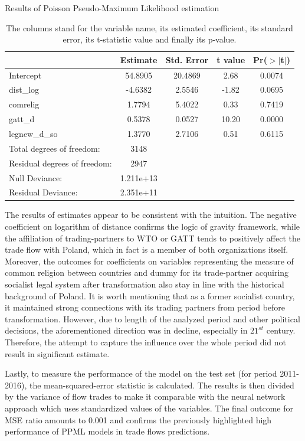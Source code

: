 \documentclass{Trade_template}
\numberwithin{equation}{section}
\begin{document}
\begin{table}[H]
\centering
\caption{Results of Poisson Pseudo-Maximum Likelihood estimation}
\begin{tabular}{lcccc}
  \hline
 & Estimate & Std. Error & t value & Pr($>$$|$t$|$) \\ 
  \hline
Intercept & 54.8905 & 20.4869 & 2.68 & 0.0074 \\ 
  dist\_log & -4.6382 & 2.5546 & -1.82 & 0.0695 \\ 
  comrelig & 1.7794 & 5.4022 & 0.33 & 0.7419 \\ 
  gatt\_d & 0.5378 & 0.0527 & 10.20 & 0.0000 \\  
  legnew\_d\_so & 1.3770 & 2.7106 & 0.51 & 0.6115 \\ 
   \hline
Total degrees of freedom: & 3148 &&& \\
Residual degrees of freedom: & 2947 &&& \\
Null Deviance:	  &  1.211e+13 & & & \\
Residual Deviance: & 2.351e+11 & & & 	\\
\hline
\end{tabular}
\caption*{\small{The columns stand for the variable name, its estimated coefficient, its standard error, its t-statistic value and finally its p-value.}}
\end{table}

The results of estimates appear to be consistent with the intuition. The negative coefficient on logarithm of distance confirms the logic of gravity framework, while the affiliation of trading-partners to WTO or GATT tends to positively affect the trade flow with Poland, which in fact is a member of both organizations itself.
Moreover, the outcomes for coefficients on variables representing the measure of common religion between countries and dummy for its trade-partner acquiring socialist legal system after transformation also stay in line with the historical background of Poland. It is worth mentioning that  as a former socialist country, it maintained strong connections with its trading partners from period before transformation. However, due to length of the analyzed period and other political decisions, the aforementioned direction was in decline, especially in $21^{st}$ century. Therefore, the attempt to capture the influence over the whole period did not result in significant estimate. 

Lastly, to measure the performance of the model on the test set (for period 2011-2016), the mean-squared-error statistic is calculated. The results is then divided by the variance of flow trades to make it comparable with the neural network approach which uses standardized values of the variables. The final outcome for MSE ratio amounts to 0.001 and confirms the previously highlighted high performance of PPML models in trade flows predictions. 
\end{document}
